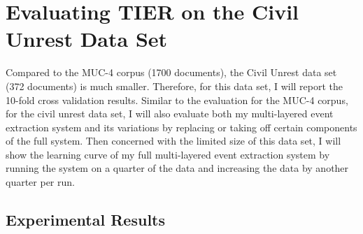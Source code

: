 \section{Evaluating TIER on the Civil Unrest Data Set}


Compared to the MUC-4 corpus (1700 documents), the 
Civil Unrest data set (372 documents) is much smaller. 
Therefore, for this data set, I will report the 10-fold cross validation results.
Similar to the evaluation for the MUC-4 corpus,
for the civil unrest data set, 
I will also evaluate both my multi-layered event extraction system and its variations 
by replacing or taking off certain components of the full system. 
Then concerned with the limited size of this data set,
I will show the learning curve of my full multi-layered event extraction system by 
running the system on a quarter of the data 
and 
increasing the data by another quarter per run. 


\subsection{Experimental Results}

